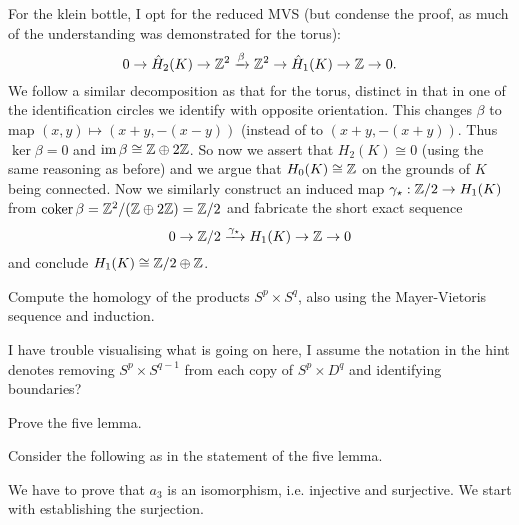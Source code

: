 \begin{questions}
\begin{solution}
    For the klein bottle, I opt for the reduced MVS (but condense the proof, as much of the understanding was demonstrated for the torus):
    \[ 0 \to \hat H_2(K) \to \mathbb{Z}^2 \xrightarrow{\beta} \mathbb{Z}^2 \to \hat H_1(K) \to \mathbb{Z} \to 0. \]
    We follow a similar decomposition as that for the torus, distinct in that in one of the identification circles we identify with opposite orientation. This changes $\beta$ to map $(x,y) \mapsto (x+y, -(x-y))$ (instead of to $(x+y, -(x+y))$. Thus $\ker \beta = 0$ and $\operatorname*{im} \beta \cong \mathbb{Z} \oplus 2\mathbb{Z}$. So now we assert that $H_2(K) \cong 0$ (using the same reasoning as before) and we argue that $H_0(K) \cong \mathbb{Z}$ on the grounds of $K$ being connected. Now we similarly construct an induced map $\gamma_\star: \mathbb{Z}/2 \to H_1(K)$ from $\operatorname*{coker} \beta = \mathbb{Z}^2/(\mathbb{Z} \oplus 2\mathbb{Z}) = \mathbb{Z}/2$ and fabricate the short exact sequence
    \[ 0 \to \mathbb{Z}/2 \xrightarrow{\gamma_\star}  H_1(K) \to \mathbb{Z} \to 0 \]
    and conclude $H_1(K) \cong \mathbb{Z}/2 \oplus \mathbb{Z}$. 
  \end{solution}

  \question Compute the homology of the products $S^p \times S^q$, also using the Mayer-Vietoris sequence and induction.
  \begin{solution}
    I have trouble visualising what is going on here, I assume the notation in the hint denotes removing $S^p \times S^{q-1}$ from each copy of $S^p \times D^q$ and identifying boundaries?
  \end{solution}

  \question Prove the five lemma.
  \begin{solution}
    Consider the following as in the statement of the five lemma.
    \begin{center}
    \end{center}
    We have to prove that $a_3$ is an isomorphism, i.e. injective and surjective. We start with establishing the surjection. 
    

\end{solution}
\end{questions}
